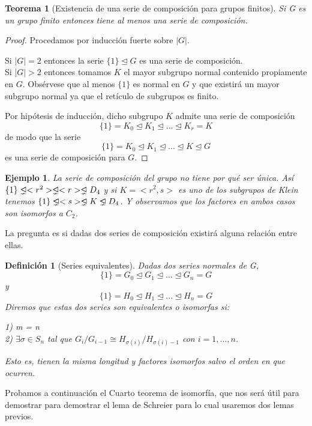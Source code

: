 \documentclass{article}
\theoremstyle{theorem-style}  %
\newtheorem{theorem}{Teorema}[section]  %
\theoremstyle{definition-style}
\newtheorem{definition}{Definición}[section]
\theoremstyle{example-style}
\newtheorem{example}{Ejemplo}[section]
\newcommand{\propernormal}{%
  \mathrel{\ooalign{$\lneq$\cr\raise.22ex\hbox{$\lhd$}\cr}}}
\begin{document}
\begin{theorem}[Existencia de una serie de composición para grupos finitos]
Si G es un grupo finito entonces tiene al menos una serie de composición.
\end{theorem}
\begin{proof}
Procedamos por inducción fuerte sobre $|G|$. 

Si $|G| = 2$ entonces la serie $\{1\} \trianglelefteq G$ es una serie de composición.\\
Si $|G| > 2$ entonces tomamos $K$ el mayor subgrupo normal contenido propiamente en $G$. Obsérvese que al menos $\{1\}$ es normal en $G$ y que existirá un mayor subgrupo normal ya que el retículo de subgrupos es finito. 

Por hipótesis de inducción, dicho subgrupo $K$ admite una serie de composición $$\{1\} = K_0 \trianglelefteq K_1 \trianglelefteq ... \trianglelefteq K_r = K$$ de modo que la serie $$\{1\} = K_0 \trianglelefteq K_1 \trianglelefteq ... \trianglelefteq K \trianglelefteq G$$ es una serie de composición para $G$.
\end{proof}

\begin{example}
La serie de composición del grupo no tiene por qué ser única. Así $\{1\} \propernormal <r^2> \propernormal <r> \propernormal D_4$ y si $K = <r^2,s>$ es uno de los subgrupos de Klein tenemos $\{1\} \propernormal <s> \propernormal K \propernormal D_4$. Y observamos que los factores en ambos casos son isomorfos a $C_2$.
\end{example}

La pregunta es si dadas dos series de composición existirá alguna relación entre ellas.

\begin{definition}[Series equivalentes]
Dadas dos series normales de G, $$\{1\} = G_0 \trianglelefteq G_1 \trianglelefteq ... \trianglelefteq G_n = G$$ y $$\{1\} = H_0 \trianglelefteq H_1 \trianglelefteq ... \trianglelefteq H_n = G$$ Diremos que estas dos series son equivalentes o isomorfas si:

1) m = n\\
2) $\exists \sigma \in S_n$ tal que $G_i/G_{i-1} \cong H_{\sigma(i)}/H_{\sigma(i)-1}$ con $i=1,...,n$. 

Esto es, tienen la misma longitud y factores isomorfos salvo el orden en que ocurren.
\end{definition}

Probamos a continuación el Cuarto teorema de isomorfía, que nos será útil para demostrar para demostrar el lema de Schreier para lo cual usaremos dos lemas previos.
\end{document}
